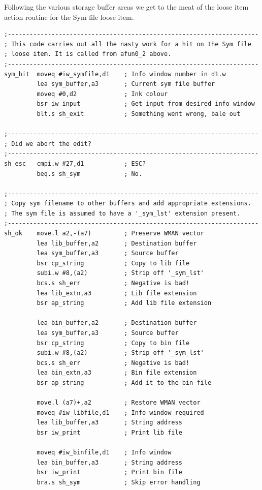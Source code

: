 Following the various storage buffer areas we get to the meat of the
    loose item action routine for the Sym file loose item.

\begin{lstlisting}[firstnumber=last,caption={LibGen\_asm - SymFile Action Code}]
;---------------------------------------------------------------------
; This code carries out all the nasty work for a hit on the Sym file
; loose item. It is called from afun0_2 above.
;---------------------------------------------------------------------
sym_hit  moveq #iw_symfile,d1    ; Info window number in d1.w
         lea sym_buffer,a3       ; Current sym file buffer
         moveq #0,d2             ; Ink colour
         bsr iw_input            ; Get input from desired info window
         blt.s sh_exit           ; Something went wrong, bale out

;---------------------------------------------------------------------
; Did we abort the edit?
;---------------------------------------------------------------------
sh_esc   cmpi.w #27,d1           ; ESC?
         beq.s sh_sym            ; No.

;---------------------------------------------------------------------
; Copy sym filename to other buffers and add appropriate extensions.
; The sym file is assumed to have a '_sym_lst' extension present.
;---------------------------------------------------------------------
sh_ok    move.l a2,-(a7)         ; Preserve WMAN vector
         lea lib_buffer,a2       ; Destination buffer
         lea sym_buffer,a3       ; Source buffer
         bsr cp_string           ; Copy to lib file
         subi.w #8,(a2)          ; Strip off '_sym_lst'
         bcs.s sh_err            ; Negative is bad!
         lea lib_extn,a3         ; Lib file extension
         bsr ap_string           ; Add lib file extension

         lea bin_buffer,a2       ; Destination buffer
         lea sym_buffer,a3       ; Source buffer
         bsr cp_string           ; Copy to bin file
         subi.w #8,(a2)          ; Strip off '_sym_lst'
         bcs.s sh_err            ; Negative is bad!
         lea bin_extn,a3         ; Bin file extension
         bsr ap_string           ; Add it to the bin file

         move.l (a7)+,a2         ; Restore WMAN vector
         moveq #iw_libfile,d1    ; Info window required
         lea lib_buffer,a3       ; String address
         bsr iw_print            ; Print lib file

         moveq #iw_binfile,d1    ; Info window
         lea bin_buffer,a3       ; String address
         bsr iw_print            ; Print bin file
         bra.s sh_sym            ; Skip error handling


\end{lstlisting}
